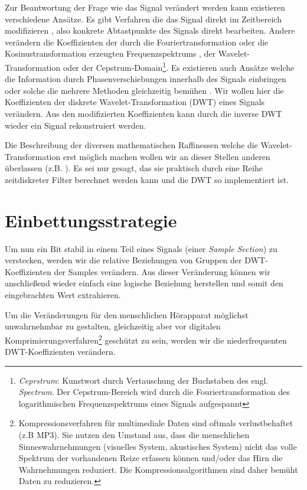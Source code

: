 Zur Beantwortung der Frage wie das Signal ver\"andert werden kann existieren verschiedene Ans\"atze. Es gibt Verfahren die das Signal direkt im Zeitbereich modifizieren \cite{bassia2001robust}\cite{lie2006robust}, also konkrete Abtastpunkte des Signals direkt bearbeiten. Andere ver\"andern die Koeffizienten der durch die Fouriertransformation oder die Kosinustransformation erzeugten Frequenzspektrums \cite{chang2012location}, der Wavelet-Transformation\cite{tang2005digital} oder der Cepstrum-Domain\footnote{\textit{Ceprstrum}: Kunstwort durch Vertauschung der Buchstaben des engl. \textit{Spectrum}. Der Cepstrum-Bereich wird durch die Fouriertransformation des logarithmischen Frequenzspektrums eines Signals aufgespannt}\cite{lee2000digital}\cite{li2000transparent}. Es existieren auch Ans\"atze welche die Information durch Phasenverschiebungen innerhalb des Signals einbringen \cite{dong2004data}\cite{ansari2004data} oder solche die mehrere Methoden gleichzeitig bem\"uhen \cite{chang2012location}\cite{lei2012multipurpose}. Wir wollen hier die Koeffizienten der diskrete Wavelet-Transformation (DWT) eines Signals ver\"andern. Aus den modifizierten Koeffizienten kann durch die inverse DWT wieder ein Signal rekonstruiert werden. 
	
Die Beschreibung der diversen mathematischen Raffinessen welche die Wavelet-Transformation erst m\"oglich machen wollen wir an dieser Stellen anderen \"uberlassen (z.B. \cite{polikar1996engineer}). Es sei nur gesagt, das sie praktisch durch eine Reihe zeitdiskreter Filter berechnet werden kann und die DWT so implementiert ist. 

\pagebreak

\section{Einbettungsstrategie}
\label{sec:embeddingstragety}

Um nun ein Bit stabil in einem Teil eines Signals (einer \textit{Sample Section}) zu verstecken, werden wir die relative Beziehungen von Gruppen der DWT-Koeffizienten der Samples verändern. Aus dieser Veränderung können wir anschließend wieder einfach eine logische Beziehung herstellen und somit den eingebrachten Wert extrahieren. 

Um die Veränderungen für den menschlichen Hörapparat möglichst unwahrnehmbar zu gestalten, gleichzeitig aber vor digitalen Komprimierungsverfahren\footnote{Kompressionsverfahren für multimediale Daten sind oftmals verlustbehaftet (z.B MP3). Sie nutzen den Umstand aus, dass die menschlichen Sinneswahrnehmungen (visuelles System, akustisches System) nicht das volle Spektrum der vorhandenen Reize erfassen können und/oder das Hirn die Wahrnehmungen reduziert. Die Kompressionsalgorithmen sind daher bemüht \grqq{} Daten zu reduzieren.} geschützt zu sein, werden wir die niederfrequenten DWT-Koeffizienten verändern. 

